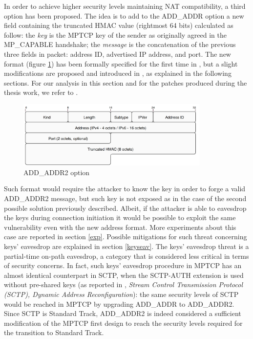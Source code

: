 In order to achieve higher security levels maintaining NAT compatibility, a third option has been proposed. The idea is to add to the ADD\_ADDR option a new field containing the truncated HMAC value (rightmost 64 bits) calculated as follow: the \textit{key} is the MPTCP key of the sender as originally agreed in the MP\_CAPABLE handshake; the \textit{message} is the concatenation of the previous three fields in packet: address ID, advertised IP address, and port. The new format (figure \ref{fig:addaddr2}) has been formally specified for the first time in , but a slight modifications are proposed and introduced in , as explained in the following sections. For our analysis in this section and for the patches produced during the thesis work, we refer to .

\begin{figure}[!htb]
\centering
\includegraphics[width=0.85\textwidth]{images/addaddr2}
\caption{ADD\_ADDR2 option}
\label{fig:addaddr2}
\end{figure}

Such format would require the attacker to know the key in order to forge a valid ADD\_ADDR2 message, but such key is not exposed as in the case of the second possible solution previously described. Albeit, if the attacker is able to eavesdrop the keys during connection initiation it would be possible to exploit the same vulnerability even with the new address format. More experiments about this case are reported in section \ref{exp}. Possible mitigations for such threat concerning keys' eavesdrop are explained in section \ref{keyseav}. The keys' eavesdrop threat is a partial-time on-path eavesdrop, a category that is considered less critical in terms of security concerns. In fact, such keys' eavesdrop procedure in MPTCP has an almost identical counterpart in SCTP, when the SCTP-AUTH extension is used without pre-shared keys (as reported in , \textit{Stream Control Transmission Protocol (SCTP), Dynamic Address Reconfiguration}): the same security levels of SCTP would be reached in MPTCP by upgrading ADD\_ADDR to ADD\_ADDR2. Since SCTP is Standard Track, ADD\_ADDR2 is indeed considered a sufficient modification of the MPTCP first design to reach the security levels required for the transition to Standard Track.

